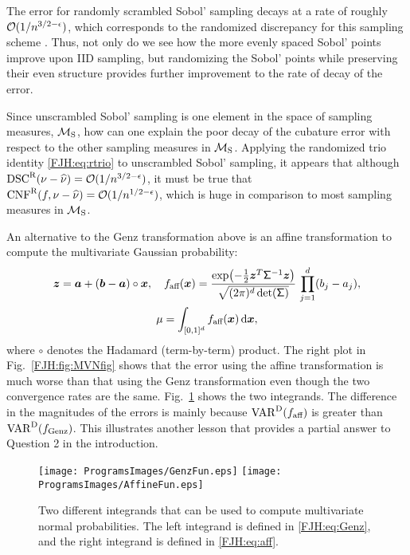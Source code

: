 \documentclass[graybox,footinfo]{svmult}
\DeclareMathOperator{\algn}{CNF}
\DeclareMathOperator{\disc}{DSC}
\DeclareMathOperator{\Var}{VAR}
\begin{document}
The error for randomly scrambled Sobol' 
sampling decays at a rate of roughly $\mathcal{O}(1/n^{3/2- \epsilon})$, which corresponds to 
the randomized discrepancy for this sampling scheme \cite{???}.  Thus, not only do we 
see how the more evenly spaced Sobol' points improve upon IID sampling, but 
randomizing the Sobol' points while preserving their even structure provides further 
improvement to the rate of decay of the error.

Since unscrambled Sobol' sampling is one element in the space of sampling measures,
${\mathcal{M}}_{\textup{S}}$, how can one explain the poor decay of the cubature error with 
respect to the other sampling measures  in  ${\mathcal{M}}_{\textup{S}}$.  Applying the 
randomized trio identity \eqref{FJH:eq:rtrio} to  unscrambled 
Sobol' sampling, it appears that although $\disc^\Rn(\nu - \hnu) = \Order(1/n^{3/2- 
\epsilon})$, it must be true that  $\algn^\Rn(f,\nu - \hnu) = \Order(1/n^{1/2- \epsilon})$, 
which is huge  in comparison to most sampling measures in
${\mathcal{M}}_{\textup{S}}$. 

\begin{FJHLesson}
\FJHLessonThree
\end{FJHLesson}

An alternative to the Genz transformation above is an affine transformation to compute 
the multivariate Gaussian probability:
\begin{gather}
\label{FJH:eq:aff}
\bsz = \bsa + (\bsb-\bsa) \circ \bsx, \quad f_{\textup{aff}}(\bsx) =  \frac{\exp\bigl(- 
\frac 12 \bsz^T
\mathsf{\Sigma}^{-1} \bsz 
	\bigr)}{\sqrt{(2 \pi)^d \det(\mathsf{\Sigma})}} \, \prod_{j=1}^d (b_j - a_j), \\
\nonumber
\mu = 
	\int_{[0,1]^{d}} f_{\textup{aff}}(\bsx) \, \D \bsx,
\end{gather} 
where $\circ$ denotes the Hadamard (term-by-term) product.  The right plot in Fig.\ 
\ref{FJH:fig:MVNfig} shows that the error using the affine 
transformation is much worse than that using the Genz transformation even though the 
two convergence rates are the same.  Fig.\ \ref{FJH:fig:GenzAfffig} shows the two 
integrands.  The difference in the magnitudes of the errors is 
mainly because $\Var^{\Dt}(f_{\textup{aff}})$ is greater than 
$\Var^{\Dt}(f_{\textup{Genz}})$.  This illustrates another 
lesson that provides a partial answer to Question 2 in the introduction.

\begin{figure}
	\centering
	\texttt{[image: ProgramsImages/GenzFun.eps]} \qquad 
	\texttt{[image: ProgramsImages/AffineFun.eps]}
	\caption{Two different integrands that can be used to compute multivariate normal 
	probabilities.  The left integrand is defined in \eqref{FJH:eq:Genz}, and the right 
	integrand is defined in  \eqref{FJH:eq:aff}.
		\label{FJH:fig:GenzAfffig}}
\end{figure}
\end{document}
